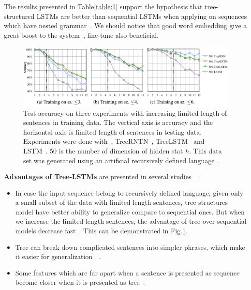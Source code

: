 The results presented in Table\ref{table:1} support the hypothesis that tree-structured LSTMs are better than sequential LSTMs when applying on sequences which have nested grammar~\cite{treeVSseq}. 
We should notice that good word embedding give a great boost to the system~\cite{Luong_betterword}, fine-tune also beneficial.

\begin{figure}[H]
    \centering
    \includegraphics[scale=0.38]{figure/tree-vs-seq}
    \caption{Test accuracy on three experiments with increasing limited length of sentences in training data. 
The vertical axis is accuracy and the horizontal axis is limited length of sentences in testing data. 
Experiments were done with~\cite{socher2013recursive}, TreeRNTN~\cite{socher2013recursive}, TreeLSTM~\cite{treeLSTM} and LSTM~\cite{originLSTM}. 
50 is the number of dimension of hidden stat \(h\). 
This data set was generated using an artificial recursively defined language~\cite{bowman-treevslstm}.} 
    \label{fig:tree-vs-seq}
\end{figure}
\label{sec:tree-discuss}
\textbf{Advantages of Tree-LSTMs} are presented in several studies~\cite{need-tree}~\cite{bowman-treevslstm}: \label{treelstm-advantage}
\begin{itemize}
\item In case the input sequence belong to recursively defined language, given only a small subset of the data with limited length sentences, tree structures model have better ability to generalize compare to sequential ones.
But when we increase the limited length sentences, the advantage of tree over sequential models decrease fast~\cite{bowman-treevslstm}. 
This can be demonstrated in Fig.\ref{fig:tree-vs-seq}.
\item Tree can break down complicated sentences into simpler phrases, which make it easier for generalization~\cite{knowledge-matter}~\cite{need-tree}.
\item Some features which are far apart when a sentence is presented as sequence become closer when it is presented as tree~\cite{need-tree}.
\end{itemize}


